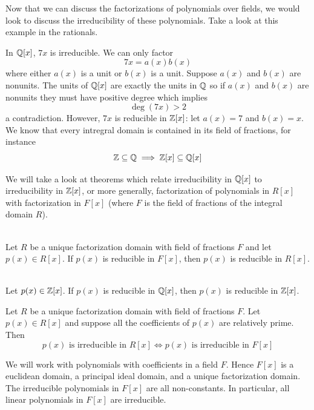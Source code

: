 Now that we can discuss the factorizations of polynomials over fields, we would look to discuss the irreducibility of these polynomials. Take a look at this example in the rationals.

\begin{example}
    In $\mathbb{Q}[x]$, $7x$ is irreducible. We can only factor
    $$7x = a(x)b(x)$$
    where either $a(x)$ is a unit or $b(x)$ is a unit. Suppose $a(x)$ and $b(x)$ are nonunits. The units of $\mathbb{Q}[x]$ are exactly the units in $\mathbb{Q}$ so if $a(x)$ and $b(x)$ are nonunits they must have positive degree which implies
    $$\deg (7x) > 2$$
    a contradiction. However, $7x$ is reducible in $\mathbb{Z}[x]$: let $a(x) = 7$ and $b(x) = x$. We know that every intregral domain is contained in its field of fractions, for instance
    $$\mathbb{Z} \subseteq \mathbb{Q} \implies \mathbb{Z}[x] \subseteq \mathbb{Q}[x]$$
\end{example}

We will take a look at theorems which relate irreducibility in $\mathbb{Q}[x]$ to irreducibility in $\mathbb{Z}[x]$, or more generally, factorization of polynomials in $R[x]$ with factorization in $F[x]$ (where $F$ is the field of fractions of the integral domain $R$).

\begin{lemma} \leavevmode \\
    Let $R$ be a unique factorization domain with field of fractions $F$ and let $p(x) \in R[x]$. If $p(x)$ is reducible in $F[x]$, then $p(x)$ is reducible in $R[x]$.
\end{lemma}

\begin{lemma} \leavevmode \\
    Let $p(x) \in \mathbb{Z}[x]$. If $p(x)$ is reducible in $\mathbb{Q}[x]$, then $p(x)$ is reducible in $\mathbb{Z}[x]$.
\end{lemma}

\begin{corollary}
    Let $R$ be a unique factorization domain with field of fractions $F$. Let $p(x) \in R[x]$ and suppose all the coefficients of $p(x)$ are relatively prime. Then 
    $$p(x) \text{ is irreducible in } R[x] \iff p(x) \text{ is irreducible in } F[x]$$
\end{corollary}

We will work with polynomials with coefficients in a field $F$. Hence $F[x]$ is a euclidean domain, a principal ideal domain, and a unique factorization domain. The irreducible polynomials in $F[x]$ are all non-constants. In particular, all linear polynomials in $F[x]$ are irreducible.

